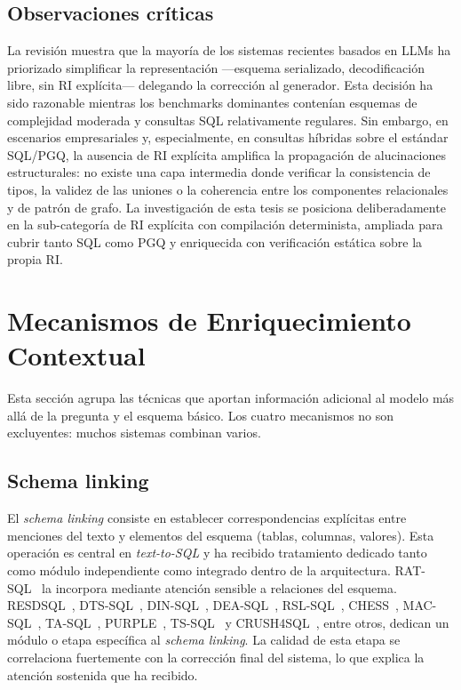 \subsection{Observaciones críticas}
\label{subsec:sota-d3-obs}

La revisión muestra que la mayoría de los sistemas recientes basados en
\acp{LLM} ha priorizado simplificar la representación ---esquema
serializado, decodificación libre, sin RI explícita--- delegando la
corrección al generador. Esta decisión ha sido razonable mientras los
benchmarks dominantes contenían esquemas de complejidad moderada y
consultas SQL relativamente regulares. Sin embargo, en escenarios
empresariales y, especialmente, en consultas híbridas sobre el estándar
\ac{SQL}/\ac{PGQ}, la ausencia de RI explícita amplifica la propagación
de alucinaciones estructurales: no existe una capa intermedia donde
verificar la consistencia de tipos, la validez de las uniones o la
coherencia entre los componentes relacionales y de patrón de grafo.
La investigación de esta tesis se posiciona deliberadamente en la %
sub-categoría de RI explícita con compilación determinista, ampliada
para cubrir tanto SQL como PGQ y enriquecida con verificación estática
sobre la propia RI.

\section{Mecanismos de Enriquecimiento Contextual}
\label{sec:sota-d4-enriquecimiento}

Esta sección agrupa las técnicas que aportan información adicional al
modelo más allá de la pregunta y el esquema básico. Los cuatro
mecanismos no son excluyentes: muchos sistemas combinan varios.

\subsection{Schema linking}
\label{subsec:sota-d4-schemalinking}

El \emph{schema linking} consiste en establecer correspondencias
explícitas entre menciones del texto y elementos del esquema (tablas,
columnas, valores). Esta operación es central en \emph{text-to-SQL} y ha
recibido tratamiento dedicado tanto como módulo independiente como
integrado dentro de la arquitectura. RAT-SQL~\cite{RAT-SQL2021} la
incorpora mediante atención sensible a relaciones del esquema.
RESDSQL~\cite{RESDSQL2023}, DTS-SQL~\cite{DTS-SQL2024},
DIN-SQL~\cite{DIN-SQL2023}, DEA-SQL~\cite{DEA-SQL2024},
RSL-SQL~\cite{RSL-SQL2024}, CHESS~\cite{CHESS2024},
MAC-SQL~\cite{MAC-SQL2023}, TA-SQL~\cite{TA-SQL2024},
PURPLE~\cite{PURPLE2024}, TS-SQL~\cite{TS-SQL2025} y
CRUSH4SQL~\cite{CRUSH4SQL2023}, entre otros, dedican un módulo o etapa
específica al \emph{schema linking}. La calidad de esta etapa se
correlaciona fuertemente con la corrección final del sistema, lo que
explica la atención sostenida que ha recibido.

